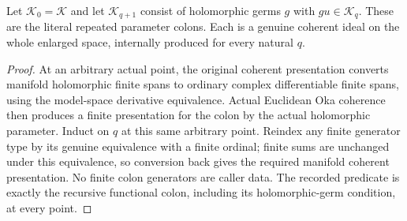 \begin{theorem}
\label{hir:relative-normal-deformation-coherent-colons}
\leanok
{}
Let $\mathcal K_0=\mathcal K$ and let $\mathcal K_{q+1}$ consist of
holomorphic germs $g$ with $gu\in\mathcal K_q$. These are the literal
repeated parameter colons. Each is a genuine coherent ideal on the whole
enlarged space, internally produced for every natural $q$.
\end{theorem}
\begin{proof}
At an arbitrary actual point, the original coherent presentation converts
manifold holomorphic finite spans to ordinary complex differentiable finite
spans, using the model-space derivative equivalence. Actual Euclidean Oka
coherence then produces a finite presentation for the colon by the actual
holomorphic parameter. Induct on $q$ at this same arbitrary point. Reindex
any finite generator type by its genuine equivalence with a finite ordinal;
finite sums are unchanged under this equivalence, so conversion back gives
the required manifold coherent presentation. No finite colon generators are
caller data. The recorded predicate is exactly the recursive functional
colon, including its holomorphic-germ condition, at every point.
\end{proof}

